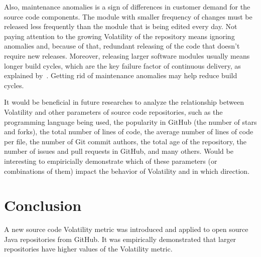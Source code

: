 \documentclass[sigplan,10pt,nonacm=true]{acmart}
\begin{document}
Also, maintenance anomalies is a sign of differences in customer demand
for the source code components. The module with smaller frequency of changes
must be released less frequently than the module that is being edited every day.
Not paying attention to the growing Volatility of the repository means
ignoring anomalies and, because of that, redundant releasing of the code
that doesn't require new releases. Moreover, releasing larger software modules
usually means longer build cycles, which are the key failure factor of
continuous delivery, as explained by~\cite{humble2010}. Getting rid of
maintenance anomalies may help reduce build cycles.

It would be beneficial in future researches to analyze the relationship between
Volatility and other parameters of source code repositories,
such as
the programming language being used,
the popularity in GitHub (the number of stars and forks),
the total number of lines of code,
the average number of lines of code per file,
the number of Git commit authors,
the total age of the repository,
the number of issues and pull requests in GitHub,
and many others.
Would be interesting to empiricially demonstrate which of these parameters
(or combinations of them)
impact the behavior of Volatility and in which direction.

\section{Conclusion}
\label{sec:conclusion}

A new source code Volatility metric was introduced and applied
to \thetotalrepos{} open source Java repositories from GitHub. It was
empirically demonstrated that larger repositories have higher values
of the Volatility metric.




\end{document}
